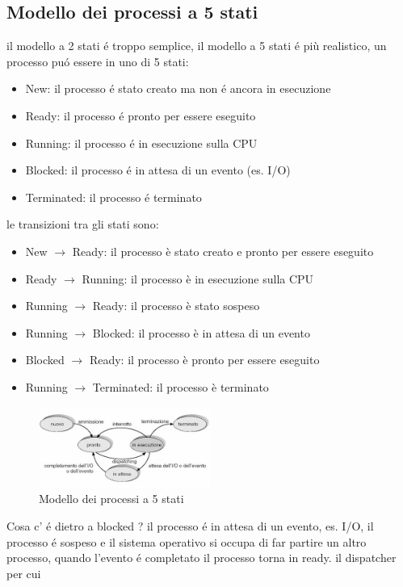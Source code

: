 \documentclass[11pt]{article}
\begin{document}
\subsection{Modello dei processi a 5 stati}
il modello a 2 stati é troppo semplice, il modello a 5 stati é più realistico, un processo puó essere in uno di 5 stati:
\begin{itemize}
    \item New: il processo é stato creato ma non é ancora in esecuzione
    \item Ready: il processo é pronto per essere eseguito
    \item Running: il processo é in esecuzione sulla CPU
    \item Blocked: il processo é in attesa di un evento (es. I/O)
    \item Terminated: il processo é terminato
    \end{itemize}
le transizioni tra gli stati sono:
\begin{itemize}
    \item New $\rightarrow$ Ready: il processo è stato creato e pronto per essere eseguito
    \item Ready $\rightarrow$ Running: il processo è in esecuzione sulla CPU
    \item Running $\rightarrow$ Ready: il processo è stato sospeso
    \item Running $\rightarrow$ Blocked: il processo è in attesa di un evento
    \item Blocked $\rightarrow$ Ready: il processo è pronto per essere eseguito
    \item Running $\rightarrow$ Terminated: il processo è terminato
\end{itemize}
\begin{figure}[h]
    \centering
    \includegraphics[width=0.5\textwidth]{immagini/processo a 5 stati}
    \caption{Modello dei processi a 5 stati}
\end{figure}
Cosa c' é dietro a blocked ? il processo é in attesa di un evento, es. I/O, il processo é sospeso e il sistema operativo
si occupa di far partire un altro processo, quando l'evento é completato il processo torna in ready. il dispatcher per cui
\end{document}
